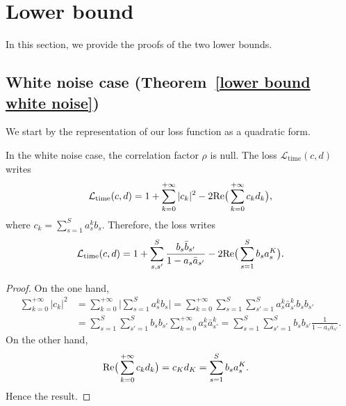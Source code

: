 \section{Lower bound}


In this section, we provide the proofs of the two lower bounds.

\subsection{White noise case (Theorem~\ref{lower bound white noise})}\label{appendix subsection white noise loss}
We start by the representation of our loss function as a quadratic form.
\begin{proposition} \label{prop white noise loss}
    In the white noise case, the correlation factor $\rho$ is null. The loss $\mathcal{L}_\text{time}(c, d)$ writes 
    \[
    \mathcal{L}_\text{time}(c, d)= 1 + \sum_{k=0}^{+\infty}\vert c_k\vert^2 - 2\textnormal{Re}\big(\sum_{k=0}^{+\infty}c_kd_k\big),
    \]
    where $c_k=\sum_{s=1}^Sa_s^kb_s$. Therefore, the loss writes 
    \[
    \mathcal{L}_\text{time}(c, d) = 1 + \sum_{s, s'}^S\frac{b_s\bar{b}_{s'}}{1-a_s\bar{a}_{s'}} - 2\textnormal{Re}\big(\sum_{s=1}^Sb_sa_s^K\big).
    \]
\end{proposition}

\begin{proof}
    On the one hand, 
    \begin{align*}
        \sum_{k=0}^{+\infty}\vert c_k\vert^2 &= \sum_{k=0}^{+\infty}\big\vert\sum_{s=1}^Sa_s^kb_s\big\vert 
        =\sum_{k=0}^{+\infty}\sum_{s=1}^S\sum_{s'=1}^Sa_s^k\bar{a}_{s'}^kb_sb_{s'} \\
        &= \sum_{s=1}^S\sum_{s'=1}^Sb_sb_{s'}\sum_{k=0}^{+\infty}a_s^k\bar{a}_{s'}^k =\sum_{s=1}^S\sum_{s'=1}^Sb_sb_{s'}\frac{1}{1-a_s\bar{a}_{s'}}.
    \end{align*}
    On the other hand,
    \begin{align*}
        \textnormal{Re}\big(\sum_{k=0}^{+\infty}c_kd_k\big) &= c_Kd_K
        =\sum_{s=1}^Sb_sa_s^K.
    \end{align*}
    Hence the result.
\end{proof}

